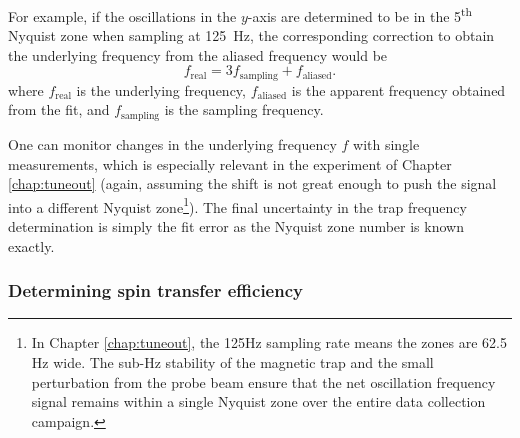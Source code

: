 	For example, if the oscillations in the \(y\)-axis are determined to be in the 5\textsuperscript{th} Nyquist zone when sampling at 125~Hz, the corresponding correction to obtain the underlying frequency from the aliased frequency would be
	\begin{equation}
	    f_{\text{real}}=3 f_{\text{sampling}} + f_{\text{aliased}}.
	\end{equation}
	where \(f_{\text{real}}\) is the underlying frequency, \(f_{\text{aliased}}\) is the apparent frequency obtained from the fit, and \(f_{\text{sampling}}\) is the sampling frequency. 

	One can monitor changes in the underlying frequency $f$ with single measurements, which is especially relevant in the experiment of Chapter \ref{chap:tuneout} (again, assuming the shift is not great enough to push the signal into a different Nyquist zone\footnote{In Chapter \ref{chap:tuneout}, the 125Hz sampling rate means the zones are 62.5 Hz wide. The sub-Hz stability of the magnetic trap and the small perturbation from the probe beam ensure that the net oscillation frequency signal remains within a single Nyquist zone over the entire data collection campaign. }).	
	The final uncertainty in the trap frequency determination is simply the fit error as the Nyquist zone number is known exactly.


\subsubsection{Determining spin transfer efficiency}
\label{sec:th_spin}

